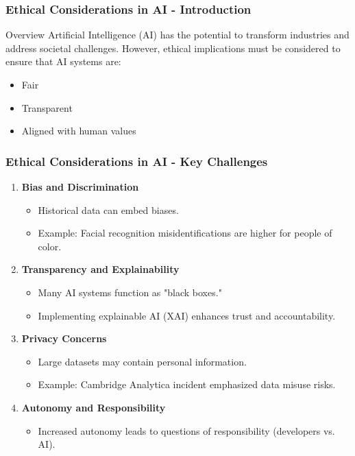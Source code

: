 \documentclass[aspectratio=169]{beamer}
\begin{document}
\begin{frame}[fragile]
    \frametitle{Ethical Considerations in AI - Introduction}
    \begin{block}{Overview}
        Artificial Intelligence (AI) has the potential to transform industries and address societal challenges. However, ethical implications must be considered to ensure that AI systems are:
        \begin{itemize}
            \item Fair
            \item Transparent
            \item Aligned with human values
        \end{itemize}
    \end{block}
\end{frame}

\begin{frame}[fragile]
    \frametitle{Ethical Considerations in AI - Key Challenges}
    \begin{enumerate}
        \item \textbf{Bias and Discrimination}
              \begin{itemize}
                  \item Historical data can embed biases.
                  \item Example: Facial recognition misidentifications are higher for people of color.
              \end{itemize}
        \item \textbf{Transparency and Explainability}
              \begin{itemize}
                  \item Many AI systems function as "black boxes."
                  \item Implementing explainable AI (XAI) enhances trust and accountability.
              \end{itemize}
        \item \textbf{Privacy Concerns}
              \begin{itemize}
                  \item Large datasets may contain personal information.
                  \item Example: Cambridge Analytica incident emphasized data misuse risks.
              \end{itemize}
        \item \textbf{Autonomy and Responsibility}
              \begin{itemize}
                  \item Increased autonomy leads to questions of responsibility (developers vs. AI).
              \end{itemize}
    \end{enumerate}
\end{frame}
\end{document}
